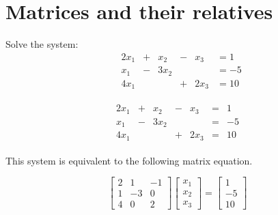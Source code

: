 \documentclass{article}
\begin{document}

\section{Matrices and their relatives}

Solve the system:
\begin{align*} %
    & 2x_1 &+ & x_2  &- & x_3  &= 1 \\
    &  x_1 &- & 3x_2 &  &      &= -5 \\
    & 4x_1 &  &      &+ & 2x_3 &= 10 
\end{align*}

\begin{eqnarray} %
    \begin{array}{rcrcrcr}
    2x_1 &+ & x_2  &- & x_3  &= & 1 \\
     x_1 &- & 3x_2 &  &      &= & -5 \\
    4x_1 &  &      &+ & 2x_3 &= & 10
    \end{array}
\end{eqnarray}


This system is equivalent to the following matrix equation.


\[
\left[
\begin{array}{rrr}
    2 & 1 & -1 \\
    1 & -3 & 0 \\
    4 & 0 & 2 
\end{array}
\right]
\left[
\begin{array}{r}
    x_1 \\
    x_2 \\
    x_3
\end{array}
\right]
=
\left[
\begin{array}{r}
    1 \\
    -5 \\
    10
\end{array}
\right]
\]

\end{document}
